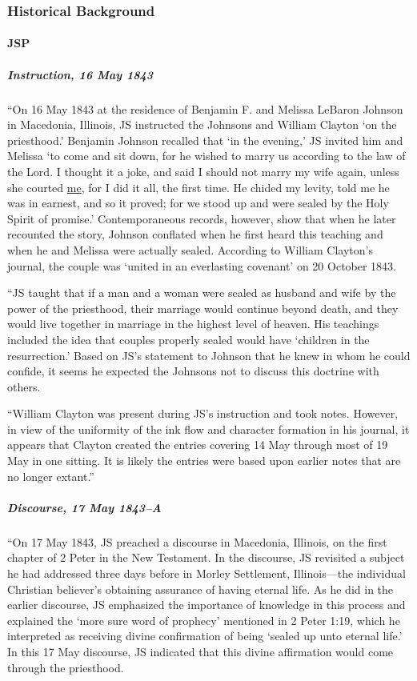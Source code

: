 	\subsubsection{Historical Background}
		\label{DC131-HB}
		
		\paragraph{JSP}
		
			\subparagraph{Instruction, 16 May 1843}
		
				``On 16 May 1843 at the residence of Benjamin F. and Melissa LeBaron Johnson in Macedonia, Illinois, JS instructed the Johnsons and William Clayton `on the priesthood.' Benjamin Johnson recalled that `in the evening,' JS invited him and Melissa `to come and sit down, for he wished to marry us according to the law of the Lord. I thought it a joke, and said I should not marry my wife again, unless she courted \uline{me}, for I did it all, the first time. He chided my levity, told me he was in earnest, and so it proved; for we stood up and were sealed by the Holy Spirit of promise.' Contemporaneous records, however, show that when he later recounted the story, Johnson conflated when he first heard this teaching and when he and Melissa were actually sealed. According to William Clayton's journal, the couple was `united in an everlasting covenant' on 20 October 1843.

				``JS taught that if a man and a woman were sealed as husband and wife by the power of the priesthood, their marriage would continue beyond death, and they would live together in marriage in the highest level of heaven. His teachings included the idea that couples properly sealed would have `children in the resurrection.' Based on JS's statement to Johnson that he knew in whom he could confide, it seems he expected the Johnsons not to discuss this doctrine with others. 

				``William Clayton was present during JS's instruction and took notes. However, in view of the uniformity of the ink flow and character formation in his journal, it appears that Clayton created the entries covering 14 May through most of 19 May in one sitting. It is likely the entries were based upon earlier notes that are no longer extant.''
				
			\subparagraph{Discourse, 17 May 1843--A}
			
				``On 17 May 1843, JS preached a discourse in Macedonia, Illinois, on the first chapter of 2 Peter in the New Testament. In the discourse, JS revisited a subject he had addressed three days before in Morley Settlement, Illinois---the individual Christian believer's obtaining assurance of having eternal life. As he did in the earlier discourse, JS emphasized the importance of knowledge in this process and explained the `more sure word of prophecy' mentioned in 2 Peter 1:19, which he interpreted as receiving divine confirmation of being `sealed up unto eternal life.' In this 17 May discourse, JS indicated that this divine affirmation would come through the priesthood. 

